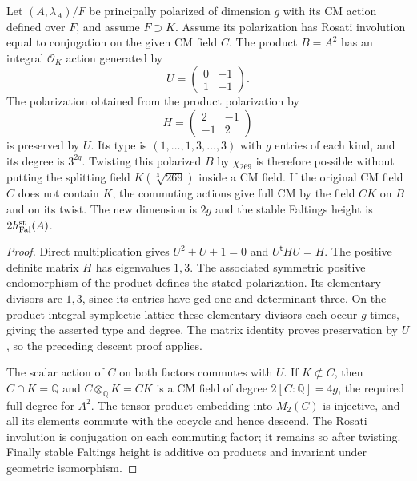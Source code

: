 \begin{corollary}
\label{AC-G24-double}
Let $(A,\lambda_A)/F$ be principally polarized of dimension $g$
with its CM action defined over $F$, and assume $F\supset K$.
Assume its polarization has Rosati involution equal to conjugation
on the given CM field $C$.
The product $B=A^2$ has an integral $\mathcal O_K$ action generated
by
\[
 U=\begin{pmatrix}0&-1\\1&-1\end{pmatrix}.
\]
The polarization obtained from the product polarization by
\[
 H=\begin{pmatrix}2&-1\\-1&2\end{pmatrix}               \tag{G24.4}
\]
is preserved by $U$.  Its type is
$(1,\ldots,1,3,\ldots,3)$ with $g$ entries of each kind,
and its degree is $3^{2g}$.  Twisting this polarized $B$ by
$\chi_{269}$ is therefore possible without putting the splitting
field $K(\sqrt[3]{269})$ inside a CM field.
If the original CM field $C$ does not contain $K$, the commuting
actions give full CM by the field $CK$ on $B$ and on its twist.
The new dimension is $2g$ and the stable Faltings height is
$2h_{\rm Fal}^{\rm st}(A)$.
\end{corollary}
\begin{proof}
Direct multiplication gives $U^2+U+1=0$ and
$U^{\mathsf t}HU=H$.  The positive definite matrix $H$ has
eigenvalues $1,3$.  The associated symmetric positive endomorphism
of the product defines the stated polarization.  Its elementary
divisors are $1,3$, since its entries have gcd one and determinant
three.  On the product integral symplectic lattice these elementary
divisors each occur $g$ times, giving the asserted type and degree.
The matrix identity proves preservation by $U$, so the preceding
descent proof applies.

The scalar action of $C$ on both factors commutes with $U$.
If $K\not\subset C$, then $C\cap K=\mathbb Q$ and
$C\otimes_{\mathbb Q}K=CK$ is a CM field of degree
$2[C:\mathbb Q]=4g$, the required full degree for $A^2$.
The tensor product embedding into $M_2(C)$ is injective, and all
its elements commute with the cocycle and hence descend.  The
Rosati involution is conjugation on each commuting factor; it
remains so after twisting.  Finally stable Faltings height is
additive on products and invariant under geometric isomorphism.
\end{proof}

